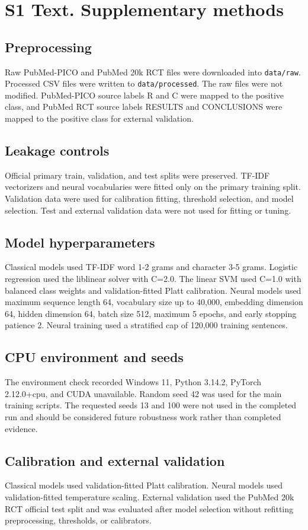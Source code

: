\section*{S1 Text. Supplementary methods}

\subsection*{Preprocessing}
Raw PubMed-PICO and PubMed 20k RCT files were downloaded into \texttt{data/raw}. Processed CSV files were written to \texttt{data/processed}. The raw files were not modified. PubMed-PICO source labels R and C were mapped to the positive class, and PubMed RCT source labels RESULTS and CONCLUSIONS were mapped to the positive class for external validation.

\subsection*{Leakage controls}
Official primary train, validation, and test splits were preserved. TF-IDF vectorizers and neural vocabularies were fitted only on the primary training split. Validation data were used for calibration fitting, threshold selection, and model selection. Test and external validation data were not used for fitting or tuning.

\subsection*{Model hyperparameters}
Classical models used TF-IDF word 1-2 grams and character 3-5 grams. Logistic regression used the liblinear solver with C=2.0. The linear SVM used C=1.0 with balanced class weights and validation-fitted Platt calibration. Neural models used maximum sequence length 64, vocabulary size up to 40,000, embedding dimension 64, hidden dimension 64, batch size 512, maximum 5 epochs, and early stopping patience 2. Neural training used a stratified cap of 120,000 training sentences.

\subsection*{CPU environment and seeds}
The environment check recorded Windows 11, Python 3.14.2, PyTorch 2.12.0+cpu, and CUDA unavailable. Random seed 42 was used for the main training scripts. The requested seeds 13 and 100 were not used in the completed run and should be considered future robustness work rather than completed evidence.

\subsection*{Calibration and external validation}
Classical models used validation-fitted Platt calibration. Neural models used validation-fitted temperature scaling. External validation used the PubMed 20k RCT official test split and was evaluated after model selection without refitting preprocessing, thresholds, or calibrators.
